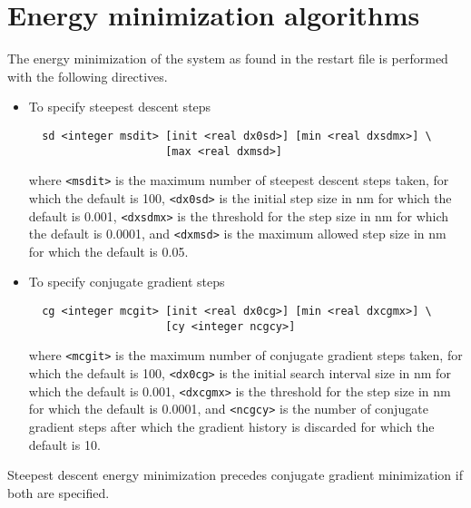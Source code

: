 \section{Energy minimization algorithms}
The energy minimization of the system as found in the restart file 
is performed with the following directives.
\begin{itemize}
\item
To specify steepest descent steps
\begin{verbatim}
  sd <integer msdit> [init <real dx0sd>] [min <real dxsdmx>] \
                     [max <real dxmsd>] 
\end{verbatim}
where \verb+<msdit>+ is the maximum number of steepest descent steps taken,
for which the default is 100, \verb+<dx0sd>+ is the initial step size in nm
for which the default is 0.001, \verb+<dxsdmx>+ is the threshold for the
step size in nm for which the default is 0.0001, and \verb+<dxmsd>+ is the
maximum allowed step size in nm for which the default is 0.05.
\item
To specify conjugate gradient steps
\begin{verbatim}
  cg <integer mcgit> [init <real dx0cg>] [min <real dxcgmx>] \
                     [cy <integer ncgcy>]
\end{verbatim}
where \verb+<mcgit>+ is the maximum number of conjugate gradient steps taken,
for which the default is 100, \verb+<dx0cg>+ is the initial search
interval size in nm
for which the default is 0.001, \verb+<dxcgmx>+ is the threshold for the
step size in nm for which the default is 0.0001, and \verb+<ncgcy>+
is the number of conjugate gradient steps after which the gradient history
is discarded for which the default is 10.
\end{itemize}
Steepest descent energy minimization precedes conjugate 
gradient minimization if both are specified.

